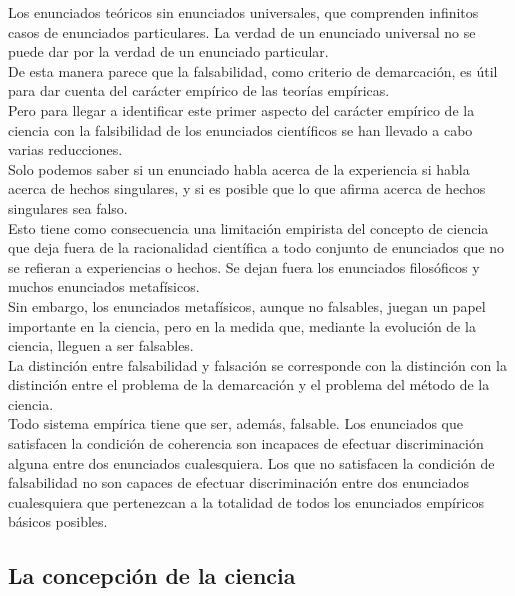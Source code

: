 \documentclass[a4paper, 11pt, twocolumn, spanish]{article}
\begin{document}
Los enunciados teóricos sin enunciados universales, que comprenden
infinitos casos de enunciados particulares. La verdad de un enunciado
universal no se puede dar por la verdad de un enunciado particular.\\[0pt]
De esta manera parece que la falsabilidad, como criterio de
demarcación, es útil para dar cuenta del carácter empírico de las
teorías empíricas.\\[0pt]

Pero para llegar a identificar este primer aspecto del carácter
empírico de la ciencia con la falsibilidad de los enunciados
científicos se han llevado a cabo varias reducciones.\\[0pt]
Solo podemos saber si un enunciado habla acerca de la experiencia si
habla acerca de hechos singulares, y si es posible que lo que afirma
acerca de hechos singulares sea falso.\\[0pt]

Esto tiene como consecuencia una limitación empirista del concepto de
ciencia que deja fuera de la racionalidad científica a todo conjunto
de enunciados que no se refieran a experiencias o hechos. Se dejan
fuera los enunciados filosóficos y muchos enunciados metafísicos.\\[0pt]
Sin embargo, los enunciados metafísicos, aunque no falsables, juegan
un papel importante en la ciencia, pero en la medida que, mediante la
evolución de la ciencia, lleguen a ser falsables.\\[0pt]

La distinción entre falsabilidad y falsación se corresponde con la
distinción con la distinción entre el problema de la demarcación y el
problema del método de la ciencia.\\[0pt]
Todo sistema empírica tiene que ser, además, falsable. Los enunciados
que satisfacen la condición de coherencia son incapaces de efectuar
discriminación alguna entre dos enunciados cualesquiera. Los que no
satisfacen la condición de falsabilidad no son capaces de efectuar
discriminación entre dos enunciados cualesquiera que pertenezcan a la
totalidad de todos los enunciados empíricos básicos posibles.

\subsection{La concepción de la ciencia}
\label{sec:org3d12e2f}
\end{document}

